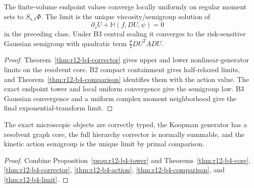 \begin{theorem}
\label{thm:r12-b4-limit}
The finite-volume endpoint values converge locally uniformly on regular moment
sets to $S_{s,t}\Phi$.  The limit is the unique viscosity/semigroup solution of
\[
 \partial_sU+\mathbb H(f,DU,\psi)=0
\]
in the preceding class.  Under B3 central scaling it converges to the
risk-sensitive Gaussian semigroup with quadratic term
$\frac\theta2DU^TADU$.
\end{theorem}

\begin{proof}
Theorem~\ref{thm:r12-b4-corrector} gives upper and lower nonlinear-generator
limits on the resolvent core.  B2 compact containment gives half-relaxed
limits, and Theorem~\ref{thm:r12-b4-comparison} identifies them with the action
value.  The exact endpoint tower and local uniform convergence give the
semigroup law.  B3 Gaussian convergence and a uniform complex moment
neighborhood give the final exponential-transform limit.
\end{proof}

\begin{theorem}
\label{thm:r12-b4-main}
The exact microscopic objects are correctly typed, the Koopman generator has
a resolvent graph core, the full hierarchy corrector is normally summable, and
the kinetic action semigroup is the unique limit by primal comparison.
\end{theorem}

\begin{proof}
Combine Proposition~\ref{prop:r12-b4-tower} and
Theorems~\ref{thm:r12-b4-core}, \ref{thm:r12-b4-corrector},
\ref{thm:r12-b4-action}, \ref{thm:r12-b4-comparison}, and
\ref{thm:r12-b4-limit}.
\end{proof}
